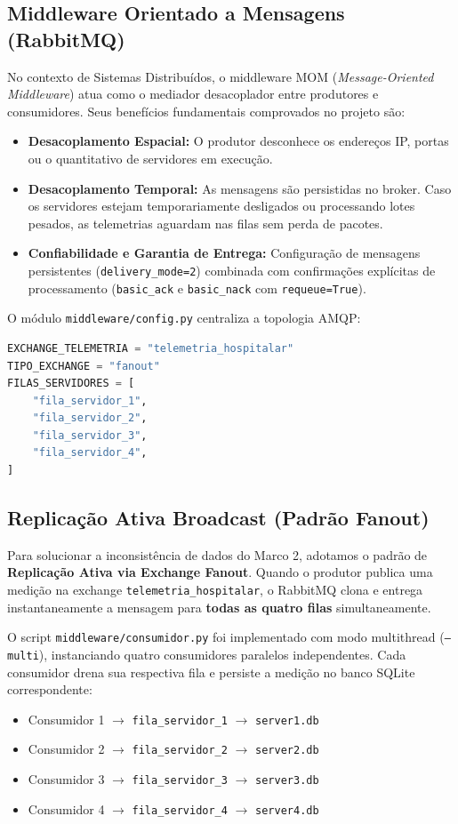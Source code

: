 \documentclass[12pt,a4paper]{article}
\begin{document}
	\subsection{Middleware Orientado a Mensagens (RabbitMQ)}
	No contexto de Sistemas Distribuídos, o middleware MOM (\textit{Message-Oriented Middleware}) atua como o mediador desacoplador entre produtores e consumidores. Seus benefícios fundamentais comprovados no projeto são:
	\begin{itemize}
		\item \textbf{Desacoplamento Espacial:} O produtor desconhece os endereços IP, portas ou o quantitativo de servidores em execução.
		\item \textbf{Desacoplamento Temporal:} As mensagens são persistidas no broker. Caso os servidores estejam temporariamente desligados ou processando lotes pesados, as telemetrias aguardam nas filas sem perda de pacotes.
		\item \textbf{Confiabilidade e Garantia de Entrega:} Configuração de mensagens persistentes (\texttt{delivery\_mode=2}) combinada com confirmações explícitas de processamento (\texttt{basic\_ack} e \texttt{basic\_nack} com \texttt{requeue=True}).
	\end{itemize}
	
	O módulo \texttt{middleware/config.py} centraliza a topologia AMQP:
	\begin{lstlisting}[language=Python, caption={Definição da Infraestrutura AMQP em middleware/config.py}]
EXCHANGE_TELEMETRIA = "telemetria_hospitalar"
TIPO_EXCHANGE = "fanout"
FILAS_SERVIDORES = [
    "fila_servidor_1",
    "fila_servidor_2",
    "fila_servidor_3",
    "fila_servidor_4",
]
	\end{lstlisting}
	
	\subsection{Replicação Ativa Broadcast (Padrão Fanout)}
	Para solucionar a inconsistência de dados do Marco 2, adotamos o padrão de \textbf{Replicação Ativa via Exchange Fanout}. Quando o produtor publica uma medição na exchange \texttt{telemetria\_hospitalar}, o RabbitMQ clona e entrega instantaneamente a mensagem para \textbf{todas as quatro filas} simultaneamente.
	
	O script \texttt{middleware/consumidor.py} foi implementado com modo multithread (\texttt{--multi}), instanciando quatro consumidores paralelos independentes. Cada consumidor drena sua respectiva fila e persiste a medição no banco SQLite correspondente:
	\begin{itemize}
		\item Consumidor 1 $\rightarrow$ \texttt{fila\_servidor\_1} $\rightarrow$ \texttt{server1.db}
		\item Consumidor 2 $\rightarrow$ \texttt{fila\_servidor\_2} $\rightarrow$ \texttt{server2.db}
		\item Consumidor 3 $\rightarrow$ \texttt{fila\_servidor\_3} $\rightarrow$ \texttt{server3.db}
		\item Consumidor 4 $\rightarrow$ \texttt{fila\_servidor\_4} $\rightarrow$ \texttt{server4.db}
	\end{itemize}
	
\end{document}
